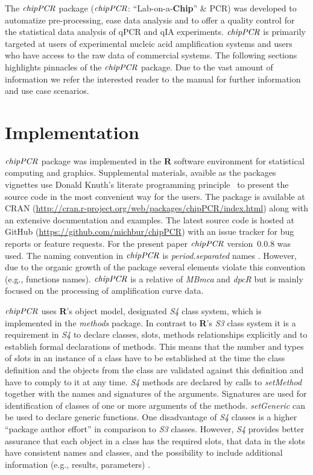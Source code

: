 \documentclass[twocolumn]{bmcart}%
\begin{document}
The $\emph{chipPCR}$ package ($\emph{chipPCR}$: ``Lab-on-a-\textbf{Chip}'' \& 
PCR) was developed to automatize pre-processing, ease data analysis and to offer 
a quality control for the statistical data analysis of qPCR and qIA 
experiments. $\emph{chipPCR}$ is primarily targeted at users of experimental 
nucleic acid amplification systems and users who have access to the raw data of 
commercial systems. The following sections highlights pinnacles of the 
$\emph{chipPCR}$ package. Due to the vast amount of information we refer the 
interested reader to the manual for further information and use case scenarios.

\section*{Implementation}

$\emph{chipPCR}$ package was implemented in the \textbf{R} software environment 
for statistical computing and graphics. Supplemental materials, avaible as the
packages vignettes use Donald Knuth's literate 
programming principle~\cite{Knuth1984} to present the source code in the most convenient 
way for the users. The package is available at CRAN 
(\url{http://cran.r-project.org/web/packages/chipPCR/index.html}) along with an 
extensive documentation and examples. The latest source code is hosted at GitHub 
(\url{https://github.com/michbur/chipPCR}) with an issue tracker for bug reports 
or feature requests. For the present paper $\emph{chipPCR}$ version~0.0.8 was 
used. The naming convention in $\emph{chipPCR}$ is \textit{period.separated} 
names \cite{Baaaath_2012}. However, due to the organic growth of the package  
several elements violate this convention (e.g., functions names). 
$\emph{chipPCR}$ is a relative of \emph{MBmca} \cite{roediger_RJ_2013} and 
\emph{dpcR} but is mainly focused on the processing of amplification curve data.

  $\emph{chipPCR}$ uses \textbf{R}’s object model, designated \emph{S4} class 
system, which is implemented in the \emph{methods} package. In contrast to 
\textbf{R}’s \emph{S3} class system it is a requirement in \emph{S4} to declare 
classes, slots, methods relationships explicitly and to establish formal 
declarations of methods. This means that the number and types of slots in an 
instance of a class have to be established at the time the class definition and 
the objects from the class are validated against this definition and have to 
comply to it at any time. \emph{S4} methods are declared by calls to 
\textsl{setMethod} together with the names and signatures of the arguments. 
Signatures are used for identification of classes of one or more arguments of 
the methods. \textsl{setGeneric} can be used to declare generic functions. One 
disadvantage of \emph{S4} classes is a higher ``package author effort'' in 
comparison to \emph{S3} classes. However, \emph{S4} provides better assurance 
that each object in a class has the required slots, that data in the slots have 
consistent names and classes, and the possibility to include additional 
information (e.g., results, parameters) \cite{Karatzoglou_2004}.
\end{document}
